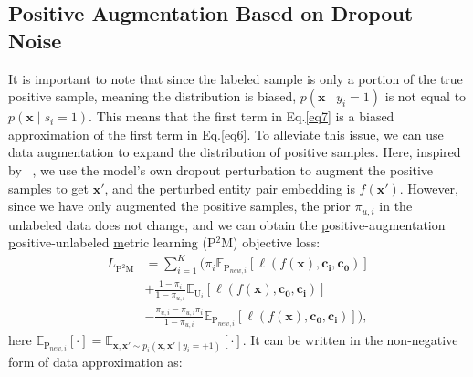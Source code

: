 \documentclass[letterpaper]{article}
\begin{document}
\subsection{Positive Augmentation Based on Dropout Noise}

It is important to note that since the labeled sample is only a portion of the true positive sample, meaning the distribution is biased, $p(\boldsymbol{x} \mid y_{i}=1)$ is not equal to $p(\boldsymbol{x} \mid s_{i}=1)$. This means that the first term in Eq.\ref{eq7} is a biased approximation of the first term in Eq.\ref{eq6}. To alleviate this issue, we can use data augmentation to expand the distribution of positive samples. Here, inspired by ~\cite{DBLP:conf/emnlp/GaoYC21}, we use the model's own dropout perturbation to augment the positive samples to get $\boldsymbol{x'}$, and the perturbed entity pair embedding is $f(\boldsymbol{x'})$. However, since we have only augmented the positive samples, the prior $\pi_{u,i}$ in the unlabeled data does not change, and we can obtain the \underline{p}ositive-augmentation \underline{p}ositive-unlabeled \underline{m}etric learning (P$^2$M) objective loss:
\begin{equation}
\begin{aligned}\label{eq8}
L_{\mathrm{P^{2}M}}&=\sum_{i=1}^{K}(\pi_{i} \mathbb{E}_{\mathrm{P}_{new,i}}[ \ell(f(\boldsymbol{x}), \boldsymbol{c_{i}}, \boldsymbol{c_{0}})] \\
&+\frac{1-\pi_{i}}{1-\pi_{u,i}} \mathbb{E}_{\mathrm{U}_{i}}[\ell(f(\boldsymbol{x}), \boldsymbol{c_{0}}, \boldsymbol{c_{i}})] \\
&-\frac{\pi_{u,i}-\pi_{u,i} \pi_{i}}{1-\pi_{u,i}}\mathbb{E}_{\mathrm{P}_{new,i}}[\ell(f(\boldsymbol{x}), \boldsymbol{c_{0}}, \boldsymbol{c_{i}})]),
\end{aligned}
\end{equation}
here $\mathbb{E}_{\mathrm{P}_{new,i}}[\cdot]=\mathbb{E}_{\boldsymbol{x},\boldsymbol{x'} \sim p_{i}(\boldsymbol{x},\boldsymbol{x'} \mid y_{i}=+1)}[\cdot]$. It can be written in the non-negative form of data approximation as:
\end{document}
